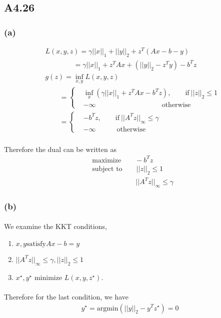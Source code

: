 \subsection*{A4.26}
\subsubsection*{(a)}
\begin{align*}
&L(x,y,z) =\gamma||x||_1 +||y||_2 +z^T(Ax-b-y)\\
&\qquad \qquad =\gamma||x||_1 +z^TAx +(||y||_2-z^Ty) -b^Tz\\
&g(z)=\inf_{x,y}L(x,y,z) \\
&\qquad =\begin{cases}
&\inf_x(\gamma||x||_1+z^TAx-b^Tz), \qquad \text{if}\ ||z||_2 \leq 1\\
&-\infty \qquad \qquad \qquad \qquad \quad \ \ \text{otherwise}
\end{cases}\\
&\qquad =\begin{cases}
&-b^Tz, \qquad \text{if}\ ||A^Tz||_\infty \leq \gamma\\
&-\infty \qquad  \quad \text{otherwise}
\end{cases}
\end{align*}
\paragraph{}
Therefore the dual can be written as
\begin{align*}
&\text{maximize} \qquad -b^Tz\\
&\text{subject to} \qquad ||z||_2 \leq 1\\
&\qquad \qquad \qquad \ ||A^Tz||_\infty \leq \gamma
\end{align*}
\subsubsection*{(b)}
\paragraph{}
We examine the KKT conditions,
\begin{enumerate}
	\item $x,y \text{satisfy} Ax-b=y$
	\item $||A^Tz||_\infty \leq \gamma, ||z||_2 \leq 1$
	\item $x^\star, y^\star$ minimize $L(x,y,z^\star)$.
\end{enumerate}
\paragraph{}
Therefore for the last condition, we have
\begin{align*}
y^\star =\text{argmin}(||y||_2-y^Tz^\star) =0
\end{align*}
